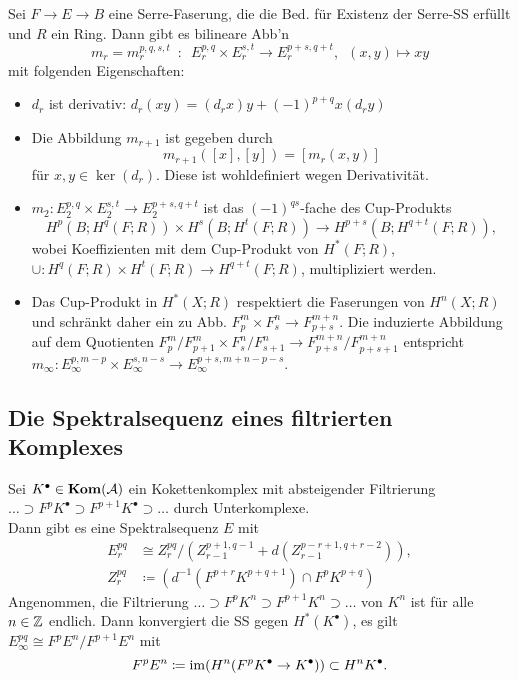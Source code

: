 \documentclass{cheat-sheet}
\newcommand{\CCC}[1]{{#1}^{\bullet}} %
\begin{document}
\begin{lem}
  Sei $F \!\to\! E \!\to\! B$ eine Serre-Faserung, die die Bed. für Existenz der Serre-SS erfüllt und  $R$ ein Ring.
  Dann gibt es bilineare Abb'n
  \[ m_r = m_r^{p,q,s,t} \enspace:\enspace E^{p,q}_r \times E^{s,t}_r \to E^{p+s,q+t}_r, \enspace (x, y) \mapsto xy \]
  mit folgenden Eigenschaften:
  \begin{itemize}
    \item $d_r$ ist derivativ: $d_r(xy) = (d_r x) y + (-1)^{p+q} x (d_r y)$
    \item Die Abbildung $m_{r+1}$ ist gegeben durch
    \[ m_{r+1}([x], [y]) = [m_r(x, y)] \]
    für $x, y \in \ker(d_r)$.
    Diese ist wohldefiniert wegen Derivativität.
    \item $m_2 : E_2^{p,q} \!\times\! E_2^{s,t} \!\to\! E_2^{p+s,q+t}$ ist das $(-1)^{qs}$-fache des Cup-Produkts
    \[ H^p(B; H^q(F; R)) \times H^s(B; H^t(F; R)) \to H^{p+s}(B; H^{q+t}(F; R)), \]
    wobei Koeffizienten mit dem Cup-Produkt von $H^*(F; R)$, ${\cup}  : H^q(F; R) \times H^t(F; R) \to H^{q+t}(F; R)$, multipliziert werden.
    \item Das Cup-Produkt in $H^*(X; R)$ respektiert die Faserungen von $H^n(X; R)$ und schränkt daher ein zu Abb. $F_p^m \times F_s^n \to F_{p+s}^{m+n}$.
    Die induzierte Abbildung auf dem Quotienten $F^m_p/F^m_{p+1} \times F^n_s/F^n_{s+1} \to F^{m+n}_{p+s} / F^{m+n}_{p+s+1}$ entspricht $m_\infty : E_\infty^{p,m-p} \times E_\infty^{s,n-s} \to E_\infty^{p+s,m+n-p-s}$.
  \end{itemize}
\end{lem}

\subsection{Die Spektralsequenz eines filtrierten Komplexes}

\begin{defn}
  Sei $\CCC{K} \in \Kom(\Aat)$ ein Kokettenkomplex mit absteigender Filtrierung $\ldots \supset F^p \CCC{K} \supset F^{p+1} \CCC{K} \supset \ldots$ durch Unterkomplexe. \\
  Dann gibt es eine Spektralsequenz $E$ mit
  \begin{align*}
    E^{pq}_r & \cong Z^{pq}_r / (Z^{p+1,q-1}_{r-1} + d(Z^{p-r+1,q+r-2}_{r-1})), \\
    Z^{pq}_r & \coloneqq (d^{-1}(F^{p+r} K^{p+q+1}) \cap F^p K^{p+q})
  \end{align*}
  Angenommen, die Filtrierung $\ldots \supset F^p K^n \supset F^{p+1} K^n \supset \ldots$ von $K^n$ ist für alle $n \in \mathbb{Z}$ endlich.
  Dann konvergiert die SS gegen $H^*(\CCC{K})$, \dh{} es gilt $E^{pq}_\infty \cong F^p E^n / F^{p+1} E^n$ mit
  \[ F^p E^n \coloneqq \im(H^n(F^p \CCC{K} \to \CCC{K})) \subset H^n\CCC{K}. \]
\end{defn}
\end{document}
